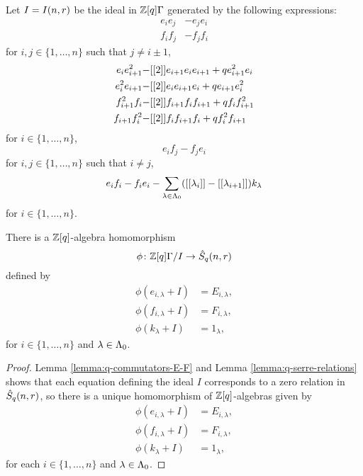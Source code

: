 \documentclass[a4paper, 11pt]{report}
\begin{document}
Let $I=I(n,r)$ be the ideal in $\mathbb{Z}[q]\Gamma$ generated by the following expressions:
\begin{align*}
e_ie_j &-e_je_i\\
f_if_j &-f_jf_i
\end{align*}
for $i,j\in\{1,\ldots,n\}$ such that $j\neq i\pm 1$,
\begin{align*}
e_ie_{i+1}^2 -&[[2]]e_{i+1}e_ie_{i+1} +qe_{i+1}^2e_i\\
e_i^2e_{i+1} -&[[2]]e_ie_{i+1}e_i +qe_{i+1}e_i^2\\
f_{i+1}^2f_i -&[[2]]f_{i+1}f_if_{i+1} +qf_if_{i+1}^2\\
f_{i+1}f_i^2 -&[[2]]f_if_{i+1}f_i +qf_i^2f_{i+1}
\end{align*}
for $i\in\{1,\ldots,n\}$,
\begin{equation*}
e_if_j-f_je_i
\end{equation*}
for $i,j\in\{1,\ldots,n\}$ such that $i\neq j$,
\begin{equation*}
e_if_i-f_ie_i - \sum_{\lambda\in\Lambda_0{}}([[\lambda_i]]-[[\lambda_{i+1}]])k_\lambda
\end{equation*}
for $i\in\{1,\ldots,n\}$.

\begin{lemma}
There is a $\mathbb{Z}[q]$-algebra homomorphism
\begin{equation*}
\phi\colon\mathbb{Z}[q]\Gamma/I \to\hat{S}_q(n,r)
\end{equation*}
defined by
\begin{align*}
\phi(e_{i,\lambda} +I) &= E_{i,\lambda},\\
\phi(f_{i,\lambda} +I) &= F_{i,\lambda},\\
\phi(k_\lambda +I) &= 1_\lambda,
\end{align*}
for $i\in\{1,\ldots,n\}$ and $\lambda\in\Lambda_0{}$.
\end{lemma}

\begin{proof}
Lemma \ref{lemma:q-commutators-E-F} and Lemma \ref{lemma:q-serre-relations} shows that each equation defining the ideal $I$ corresponds to a zero relation in $\hat{S}_q(n,r)$, so there is a unique homomorphism of $\mathbb{Z}[q]$-algebras given by
\begin{align*}
\phi(e_{i,\lambda} +I) &= E_{i,\lambda},\\
\phi(f_{i,\lambda} +I) &= F_{i,\lambda},\\
\phi(k_\lambda +I) &= 1_\lambda,
\end{align*}
for each $i\in\{1,\ldots,n\}$ and $\lambda\in\Lambda_0{}$.
\end{proof}
\end{document}
